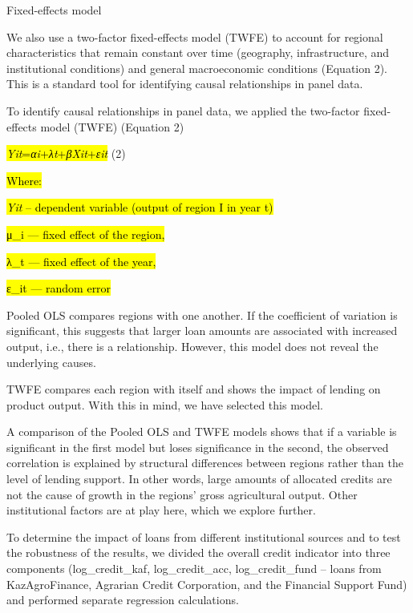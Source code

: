 Fixed-effects model

We also use a two-factor fixed-effects model (TWFE) to account for
regional characteristics that remain constant over time (geography,
infrastructure, and institutional conditions) and general macroeconomic
conditions (Equation 2). This is a standard tool for identifying causal
relationships in panel data.

To identify causal relationships in panel data, we applied the
two-factor fixed-effects model (TWFE) (Equation 2)

\hl{\emph{Yit}\hspace{0pt}=\emph{αi}\hspace{0pt}+\emph{λt}\hspace{0pt}+\emph{βXit}\hspace{0pt}+\emph{εit}}\hspace{0pt}
(2)

\hl{Where:}

\hl{\emph{Yit}\hspace{0pt} -- dependent variable (output of region I in
year t)}

\hl{μ\_i --- fixed effect of the region,}

\hl{λ\_t --- fixed effect of the year,}

\hl{ε\_it --- random error}

Pooled OLS compares regions with one another. If the coefficient of
variation is significant, this suggests that larger loan amounts are
associated with increased output, i.e., there is a relationship.
However, this model does not reveal the underlying causes.

TWFE compares each region with itself and shows the impact of lending on
product output. With this in mind, we have selected this model.

A comparison of the Pooled OLS and TWFE models shows that if a variable
is significant in the first model but loses significance in the second,
the observed correlation is explained by structural differences between
regions rather than the level of lending support. In other words, large
amounts of allocated credits are not the cause of growth in the regions'
gross agricultural output. Other institutional factors are at play here,
which we explore further.

To determine the impact of loans from different institutional sources
and to test the robustness of the results, we divided the overall credit
indicator into three components (log\_credit\_kaf, log\_credit\_acc,
log\_credit\_fund -- loans from KazAgroFinance, Agrarian Credit
Corporation, and the Financial Support Fund) and performed separate
regression calculations.

